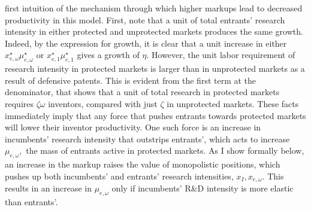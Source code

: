 first intuition of the mechanism through which higher markups lead
to decreased productivity in this model. First, note that a unit of
total entrants' research intensity in either protected and unprotected
markets produces the same growth. Indeed, by the expression for growth,
it is clear that a unit increase in either $x_{e,\omega}^{\star}\mu_{e,\omega}^{\star}$
or $x_{e,1}^{\star}\mu_{e,1}^{\star}$ gives a growth of $\eta$.
However, the unit labor requirement of research intensity in protected
markets is larger than in unprotected markets as a result of defensive
patents. This is evident from the first term at the denominator, that
shows that a unit of total research in protected markets requires
$\zeta\omega$ inventors, compared with just $\zeta$ in unprotected
markets. These facts immediately imply that any force that pushes
entrants towards protected markets will lower their inventor productivity.
One such force is an increase in incumbents' research intensity that
outstrips entrants', which acts to increase $\mu_{e,\omega},$ the
mass of entrants active in protected markets. As I show formally below,
an increase in the markup raises the value of monopolistic positions,
which pushes up both incumbents' and entrants' research intensities,
$x_{I},x_{e,\omega}.$ This results in an increase in $\mu_{e,\omega}$
only if incumbents' R\&D intensity is more elastic than entrants'. 

